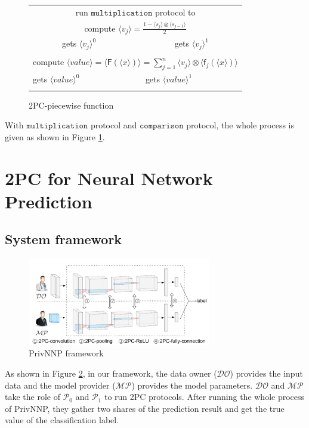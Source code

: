 \documentclass[letterpaper]{article} %
\begin{document}
\begin{figure}[ht]
{\begin{tabular}{lcl}
        \multicolumn{3}{c}{run $\mathtt{multiplication}$ protocol to}\\
        \multicolumn{3}{c}{compute
        $\langle v_{j} \rangle= \frac{1-\langle s_{j}\rangle\otimes \langle s_{j-1}\rangle}{2}$}\\
        ~~~~~~~gets $\langle v_{j}\rangle ^{0}$& &~~~~~~~gets $\langle v_{j}\rangle ^{1}$\\
        \hdashline
        \hdashline
        \multicolumn{3}{c}{run $\mathtt{multiplication}$ protocol to}\\
        \multicolumn{3}{c}{compute
        $\langle value\rangle=\langle \mathsf{F}(\langle x\rangle)\rangle=\sum_{j=1}^{n}\langle v_{j}\rangle\otimes \langle \mathsf{f}_{j}(\langle x\rangle)\rangle$}\\
        gets $\langle value\rangle ^{0}$& &gets $\langle value\rangle ^{1}$\\
        \hdashline
        \hline

    \end{tabular}}
    \caption{2PC-piecewise function}
    \label{2PC-piecewise}


    \end{figure}
    With $\mathtt{multiplication}$ protocol and $\mathtt{comparison}$ protocol,
    the whole process is given as shown in Figure \ref{2PC-piecewise}.
\section{2PC for Neural Network Prediction}

    \subsection{System framework}
    \begin{figure}[ht]

        \centering
        \includegraphics[width=8cm]{screenshot3.png}
        \caption{PrivNNP framework}
        \label{framework}
    \end{figure}
    As shown in Figure \ref{framework}, in our framework,
    the data owner ($\mathcal{DO}$) provides the input data
    and the model provider ($\mathcal{MP}$) provides the model parameters.
    $\mathcal{DO}$ and $\mathcal{MP}$ take the role of
    $\mathcal{P}_{0}$ and $\mathcal{P}_{1}$ to run 2PC protocols.
    After running the whole process of PrivNNP, they gather two shares of the prediction result and
    get the true value of the classification label.
\end{document}
